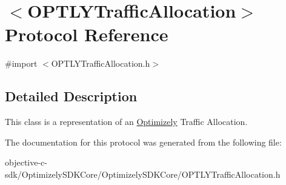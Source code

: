 \hypertarget{protocol_o_p_t_l_y_traffic_allocation-p}{}\section{$<$O\+P\+T\+L\+Y\+Traffic\+Allocation$>$ Protocol Reference}
\label{protocol_o_p_t_l_y_traffic_allocation-p}


{\ttfamily \#import $<$O\+P\+T\+L\+Y\+Traffic\+Allocation.\+h$>$}



\subsection{Detailed Description}
This class is a representation of an \mbox{\hyperlink{interface_optimizely}{Optimizely}} Traffic Allocation. 

The documentation for this protocol was generated from the following file\+:\begin{DoxyCompactItemize}
\item 
objective-\/c-\/sdk/\+Optimizely\+S\+D\+K\+Core/\+Optimizely\+S\+D\+K\+Core/O\+P\+T\+L\+Y\+Traffic\+Allocation.\+h\end{DoxyCompactItemize}
